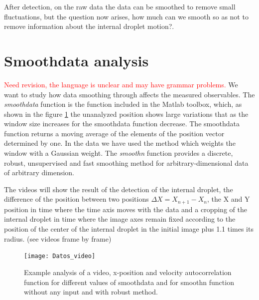 \documentclass[%
10pt,
superscriptaddress,
twocolumn,
 amsmath,amssymb,
 aps,prx,
]{revtex4-2}
\begin{document}
After detection, on the raw data the data can be smoothed to remove small fluctuations, but the question now arises, how much can we smooth so as not to remove information about the internal droplet motion?.

\section{Smoothdata analysis}
\label{smoothdata}
\textcolor{red}{Need revision, the language is unclear and may have grammar problems.}
We want to study how data smoothing through affects the measured observables. 
The \textit{smoothdata} function is the function included in the Matlab toolbox, which, as shown in the figure \ref{Datos_videos} the unanalyzed position shows large variations that as the window size increases for the smoothdata function decrease. 
%
The smoothdata function returns a moving average of the elements of the position vector determined by one. 
In the data we have used the  method which weights the window with a Gaussian weight.
The \textit{smoothn} function provides a discrete, robust, unsupervised and fast smoothing method for arbitrary-dimensional data of arbitrary dimension.

The videos will show the result of the detection of the internal droplet, the difference of the position between two positions $\Delta X = X_{n+1}-X_{n}$, the X and Y position in time where the time axis moves with the data and a cropping of the internal droplet in time where the image axes remain fixed according to the position of the center of the internal droplet in the initial image plus 1.1 times its radius. (see videos frame by frame)
\begin{figure}[b]
	\texttt{[image: Datos\_video]}
	\caption{Example analysis of a video, x-position and velocity autocorrelation function for different values of smoothdata and for smoothn function without any input and with robust method.}
	\label{Datos_videos}
\end{figure}


\onecolumngrid
\end{document}
